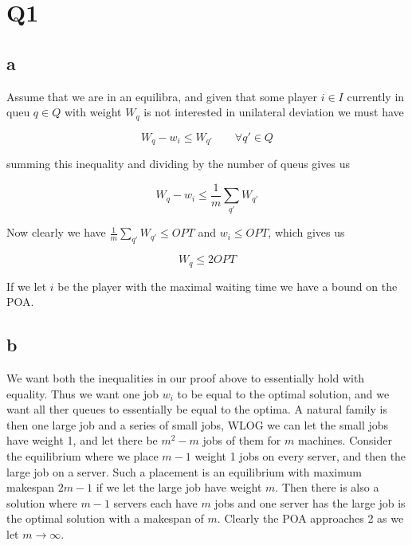 
\section*{Q1}

\subsection*{a}

Assume that we are in an equilibra, and given that some player $i\in I$ currently in queu $q \in Q$ with weight $W_q$ is not interested in unilateral deviation we must have

$$
W_q - w_i \le W_{q'} \qquad \forall q' \in Q
$$

summing this inequality and dividing by the number of queus gives us

$$
W_q - w_i \le \frac{1}{m} \sum_{q'} W_{q'}
$$

Now clearly we have $\frac{1}{m} \sum_{q'} W_{q'} \le OPT$ and $w_i \le OPT$, which gives us

$$
W_q \le 2 OPT
$$

If we let $i$ be the player with the maximal waiting time we have a bound on the POA.

\subsection*{b}

We want both the inequalities in our proof above to essentially hold with equality. Thus we want one job $w_i$ to be equal to the optimal solution, and we want all ther queues to essentially be equal to the optima. A natural family is then one large job and a series of small jobs, WLOG we can let the small jobs have weight 1, and let there be $m^2-m$ jobs of them for $m$ machines. Consider the equilibrium where we place $m-1$ weight 1 jobs on every server, and then the large job on a server. Such a placement is an equilibrium with maximum makespan $2m -1$ if we let the large job have weight $m$. Then there is also a solution where $m-1$ servers each have $m$ jobs and one server has the large job is the optimal solution with a makespan of $m$. Clearly the POA approaches 2 as we let $m \rightarrow \infty$.



